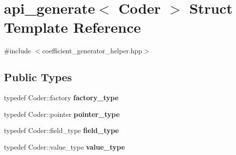 \hypertarget{structapi__generate}{\section{api\-\_\-generate$<$ Coder $>$ Struct Template Reference}
\label{structapi__generate}
}


{\ttfamily \#include $<$coefficient\-\_\-generator\-\_\-helper.\-hpp$>$}

\subsection*{Public Types}
\begin{DoxyCompactItemize}
\item 
\hypertarget{structapi__generate_aa4c7180db5894872551ab5f910f2d782}{typedef Coder\-::factory {\bfseries factory\-\_\-type}}\label{structapi__generate_aa4c7180db5894872551ab5f910f2d782}

\item 
\hypertarget{structapi__generate_a2c9cb6fcf11fcd294553ac121f28f17d}{typedef Coder\-::pointer {\bfseries pointer\-\_\-type}}\label{structapi__generate_a2c9cb6fcf11fcd294553ac121f28f17d}

\item 
\hypertarget{structapi__generate_ac8dcb93f2877bdf1b29baf26676fcd42}{typedef Coder\-::field\-\_\-type {\bfseries field\-\_\-type}}\label{structapi__generate_ac8dcb93f2877bdf1b29baf26676fcd42}

\item 
\hypertarget{structapi__generate_a10f6c06a5f0454d401fc1ba5e7577eb0}{typedef Coder\-::value\-\_\-type {\bfseries value\-\_\-type}}\label{structapi__generate_a10f6c06a5f0454d401fc1ba5e7577eb0}

\end{DoxyCompactItemize}
